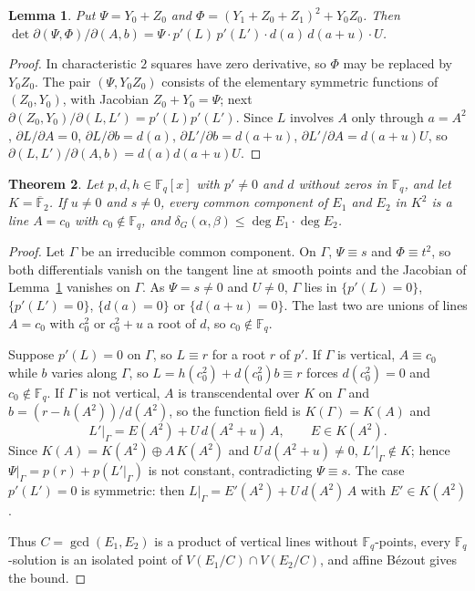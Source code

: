 \documentclass[11pt]{amsart}
\newtheorem{theorem}{Theorem}[section]
\newtheorem{lemma}[theorem]{Lemma}
\theoremstyle{definition}
\newcommand{\Fq}{\mathbb{F}_q}
\newcommand{\Fb}{\overline{\mathbb{F}}_2}
\newcommand{\diff}{\delta}
\begin{document}
\begin{lemma}\label{lem:jac}
Put $\Psi=Y_0+Z_0$ and $\Phi=(Y_1+Z_0+Z_1)^2+Y_0Z_0$. Then
$\det\partial(\Psi,\Phi)/\partial(A,b)=\Psi\cdot p'(L)\,p'(L')\cdot d(a)\,d(a+u)\cdot U$.
\end{lemma}
\begin{proof}
In characteristic $2$ squares have zero derivative, so $\Phi$ may be replaced by $Y_0Z_0$. The pair $(\Psi,Y_0Z_0)$ consists of the
elementary symmetric functions of $(Z_0,Y_0)$, with Jacobian $Z_0+Y_0=\Psi$; next $\partial(Z_0,Y_0)/\partial(L,L')=p'(L)p'(L')$.
Since $L$ involves $A$ only through $a=A^2$, $\partial L/\partial A=0$, $\partial L/\partial b=d(a)$, $\partial L'/\partial b=d(a+u)$,
$\partial L'/\partial A=d(a+u)U$, so $\partial(L,L')/\partial(A,b)=d(a)d(a+u)U$.
\end{proof}

\begin{theorem}\label{thm:general}
Let $p,d,h\in\Fq[x]$ with $p'\ne0$ and $d$ without zeros in $\Fq$, and let $K=\Fb$. If $u\ne0$ and $s\ne0$, every common component of
$E_1$ and $E_2$ in $K^2$ is a line $A=c_0$ with $c_0\notin\Fq$, and $\diff_G(\alpha,\beta)\le\deg E_1\cdot\deg E_2$.
\end{theorem}
\begin{proof}
Let $\Gamma$ be an irreducible common component. On $\Gamma$, $\Psi\equiv s$ and $\Phi\equiv t^2$, so both differentials vanish on the
tangent line at smooth points and the Jacobian of Lemma~\ref{lem:jac} vanishes on $\Gamma$. As $\Psi=s\ne0$ and $U\ne0$, $\Gamma$ lies in
$\{p'(L)=0\}$, $\{p'(L')=0\}$, $\{d(a)=0\}$ or $\{d(a+u)=0\}$. The last two are unions of lines $A=c_0$ with $c_0^2$ or $c_0^2+u$ a root of
$d$, so $c_0\notin\Fq$.

Suppose $p'(L)=0$ on $\Gamma$, so $L\equiv r$ for a root $r$ of $p'$. If $\Gamma$ is vertical, $A\equiv c_0$ while $b$ varies along $\Gamma$, so
$L=h(c_0^2)+d(c_0^2)b\equiv r$ forces $d(c_0^2)=0$ and $c_0\notin\Fq$. If $\Gamma$ is not vertical, $A$ is transcendental over $K$ on $\Gamma$ and
$b=(r-h(A^2))/d(A^2)$, so the function field is $K(\Gamma)=K(A)$ and
\[
L'|_\Gamma=E(A^2)+U\,d(A^2+u)\,A,\qquad E\in K(A^2).
\]
Since $K(A)=K(A^2)\oplus A\,K(A^2)$ and $U\,d(A^2+u)\ne0$, $L'|_\Gamma\notin K$; hence $\Psi|_\Gamma=p(r)+p(L'|_\Gamma)$ is not constant,
contradicting $\Psi\equiv s$. The case $p'(L')=0$ is symmetric: then $L|_\Gamma=E'(A^2)+U\,d(A^2)\,A$ with $E'\in K(A^2)$.

Thus $C=\gcd(E_1,E_2)$ is a product of vertical lines without $\Fq$-points, every $\Fq$-solution is an isolated point of
$V(E_1/C)\cap V(E_2/C)$, and affine B\'ezout gives the bound.
\end{proof}
\end{document}
